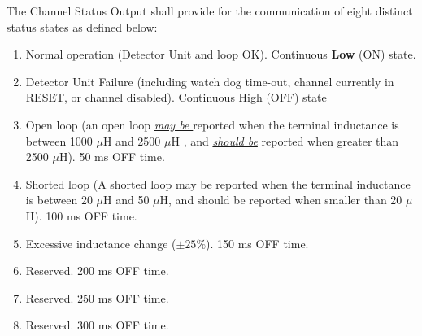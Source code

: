 \documentclass[]{article}
\begin{document}
\begin{tcolorbox}[enhanced, colback=white,title= NEMA TS2 2021 Section 6.5.2.26.3,	drop fuzzy shadow,]
The Channel Status Output shall provide for the communication of eight distinct status states as defined below:
\begin{enumerate}
	\item Normal operation (Detector Unit and loop OK). Continuous \textbf{Low} (ON) state.
	\item Detector Unit Failure (including watch dog time-out, channel currently in RESET, or channel disabled). Continuous High (OFF) state
	\item Open loop (an open loop \textit{\underline{may be }}reported when the terminal inductance is between 1000 $\mu$H and 2500 $\mu$H , and \underline{\textit{should be}} reported when greater than 2500 $\mu$H). 50 ms OFF time.
	\item Shorted loop (A shorted loop may be reported when the terminal inductance is between 20 $\mu$H and 50 $\mu$H, and should be reported when smaller than 20 $\mu$H). 100 ms OFF time.
	\item Excessive inductance change ($\pm25\%$). 150 ms OFF time.
	\item Reserved. 200 ms OFF time.
	\item Reserved. 250 ms OFF time.
	\item Reserved. 300 ms OFF time.
\end{enumerate}	 
\end{tcolorbox}
\end{document}

